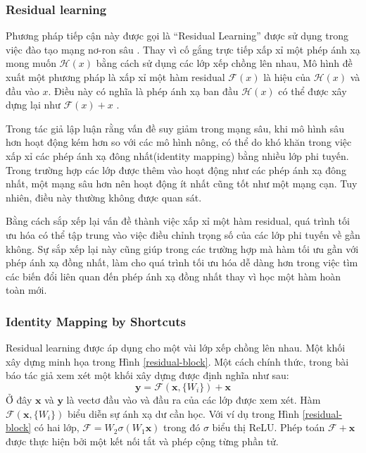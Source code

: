 \subsubsection*{Residual learning}
Phương pháp tiếp cận này được gọi là ``Residual Learning'' được sử dụng trong việc đào tạo mạng nơ-ron sâu . Thay vì cố gắng trực tiếp xấp xỉ một phép ánh xạ mong muốn $\mathcal{H}(x)$ bằng cách sử dụng các lớp xếp chồng lên nhau, Mô hình đề xuất một phương pháp là xấp xỉ một hàm residual $\mathcal{F}(x)$ là hiệu của $\mathcal{H}(x)$ và đầu vào $x$. Điều này có nghĩa là phép ánh xạ ban đầu $\mathcal{H}(x)$ có thể được xây dựng lại như $\mathcal{F}(x) + x$ \cite{he2015deep}.

Trong \cite{he2015deep} tác giả lập luận rằng vấn đề suy giảm trong mạng sâu, khi mô hình sâu hơn hoạt động kém hơn so với các mô hình nông, có thể do khó khăn trong việc xấp xỉ các phép ánh xạ đông nhất(identity mapping) bằng nhiều lớp phi tuyến. Trong trường hợp các lớp được thêm vào hoạt động như các phép ánh xạ đông nhất, một mạng sâu hơn nên hoạt động ít nhất cũng tốt như một mạng cạn. Tuy nhiên, điều này thường không được quan sát.

Bằng cách sắp xếp lại vấn đề thành việc xấp xỉ một hàm residual, quá trình tối ưu hóa có thể tập trung vào việc điều chỉnh trọng số của các lớp phi tuyến về gần không. Sự sắp xếp lại này cũng giúp trong các trường hợp mà hàm tối ưu gần với phép ánh xạ đồng nhất, làm cho quá trình tối ưu hóa dễ dàng hơn trong việc tìm các biến đổi liên quan đến phép ánh xạ đồng nhất thay vì học một hàm hoàn toàn mới.

\subsubsection{Identity Mapping by Shortcuts}
Residual learning được áp dụng cho một vài lớp xếp chồng lên nhau. Một khối xây dựng minh họa trong Hình \ref{residual-block}. Một cách chính thức, trong bài báo \cite{he2015deep} tác giả xem xét một khối xây dựng được định nghĩa như sau: 
$$\mathbf{y} = \mathcal{F}(\mathbf{x}, \{W_i\}) + \mathbf{x}$$ 
Ở đây $\mathbf{x}$ và $\mathbf{y}$ là vectơ đầu vào và đầu ra của các lớp được xem xét. Hàm $\mathcal{F}(\mathbf{x}, \{W_i\})$ biểu diễn sự ánh xạ dư cần học. Với ví dụ trong Hình \ref{residual-block} có hai lớp, $\mathcal{F} = W_2 \sigma (W_1 \mathbf{x})$ trong đó $\sigma$ biểu thị ReLU. Phép toán $\mathcal{F} + \mathbf{x}$ được thực hiện bởi một kết nối tắt và phép cộng từng phần tử.

